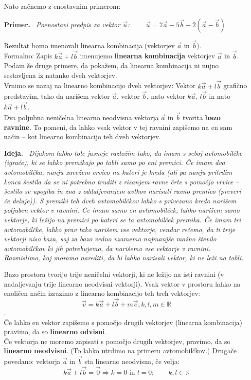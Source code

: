 \documentclass[a4paper,11pt]{article}
\newcommand{\RR}{\mathbb{R}}
\newenvironment{ide}{%
  \par\medskip\noindent\textbf{Ideja.}\itshape\ }{\par\medskip}
\newenvironment{primer}{%
  \par\medskip\noindent\textbf{Primer.}\itshape\ }{\par\medskip}
\begin{document}
Nato začnemo z enostavnim primerom: 
\begin{primer}
    Poenostavi predpis za vektor $\vec{u}$: $\qquad \vec{u}=7\vec{a}-5\vec{b}-2(\vec{a}-\vec{b})$
\end{primer}
\noindent Rezultat bomo imenovali linearna kombinacija (vektorjev $\vec{a}$ in $\vec{b}$).\\
Formalno: Zapis $k\vec{a}+l\vec{b}$ imenujemo \textbf{linearna kombinacija} vektorjev $\vec{a}$ in $\vec{b}$. Podam še druge primere, da pokažem, da linearna kombinacija ni nujno sestavljena iz natanko dveh vektorjev.\\
Vrnimo se nazaj na linearno kombinacijo dveh vektorjev:
Vektor $k\vec{a}+l\vec{b}$ grafično predstavim, tako da narišem vektor $\vec{a}$, vektor $\vec{b}$, nato vektor $k\vec{a}$, $l\vec{b}$ in nato $k\vec{a}+l\vec{b}$.\\
Dva poljubna neničelna linearno neodvisna vektorja $\vec{a}$ in $\vec{b}$ tvorita \textbf{bazo ravnine}. To pomeni, da lahko vsak vektor v tej ravnini zapišemo na en sam način -- kot linearno kombinacijo teh dveh vektorjev.\\ 
\begin{ide}
    Dijakom lahko tole jasneje razložim tako, da imam s seboj avtomobilčke (igrače), ki se lahko premikajo po tabli samo po eni premici. Če imam dva avtomobilčka, nanju zavežem vrvico na kateri je kreda 
    (ali pa nanju pritrdim konca šestila da se ni potrebno truditi z risanjem ravne črte s pomočjo vrvice -- šestilo se upogiba in zna z oddaljevanjem avtkov narisati ravno premico (preveri če deluje)).
     S premiki teh dveh avtomobilčkov lahko s privezano kredo narišem poljuben vektor v ravnini. Če imam samo en avtomobilček, lahko narišem samo vektorje, ki ležijo na premici po kateri se ta avtomobilček premika.
      Če imam tri avtomobilčke, lahko prav tako narišem vse vektorje, vendar rečemo, da ti trije vektorji niso baza, saj za bazo vedno vzamemo najmanjše možno število avtomobilčkov ki jih potrebujemo, da narišemo vse vektorje v ravnini. Razmislimo, kaj moramo narediti, da bi lahko narisali vektor, ki ne leži na tabli.
\end{ide}
Bazo prostora tvorijo trije neničelni vektorji, ki ne ležijo na isti ravnini (v nadaljevanju trije linearno neodvisni vektorji). Vsak vektor v prostoru lahko na enoličen način izrazimo z linearno kombinacijo teh treh vektorjev: $$\vec{v}=k\vec{a}+l\vec{b}+m\vec{c}; k,l,m\in\RR$$.\\

Če lahko en vektor zapišemo s pomočjo drugih vektorjev (linearna kombinacija) pravimo, da so \textbf{linearno odvisni}.\\
Če vektorja ne moremo zapisati s pomočjo drugih vektorjev, pravimo, da so \textbf{linearno neodvisni}. (To lahko utrdimo na primeru avtomobilčkov.) Drugače povedano: vektorja $\vec{a}$ in $\vec{b}$ sta linearno neodvisna, če velja: $$k\vec{a}+l\vec{b}=\vec{0}\Rightarrow k=0\text{ in }l=0;\qquad k,l\in\RR$$
\end{document}
